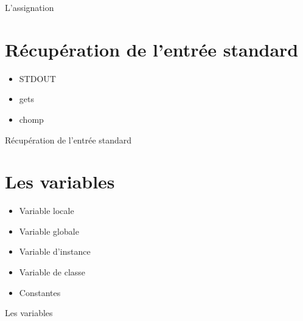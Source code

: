 \documentclass{beamer}
\begin{document}
\begin{frame}
  \begin{beamerboxesrounded}{L'assignation}
    
  \end{beamerboxesrounded}
\end{frame}

\section{Récupération de l'entrée standard}

\begin{frame}
  \begin{itemize}
    \item STDOUT
    \item gets
    \item chomp
  \end{itemize}
\end{frame}

\begin{frame}
  \begin{beamerboxesrounded}{R\'ecup\'eration de l'entr\'ee standard}
    
  \end{beamerboxesrounded}
\end{frame}

\section{Les variables}

\begin{frame}
  \begin{itemize}
    \item Variable locale
    \item Variable globale
    \item Variable d'instance
    \item Variable de classe
    \item Constantes
  \end{itemize}
\end{frame}

\begin{frame}
  \begin{beamerboxesrounded}{Les variables}
    
  \end{beamerboxesrounded}
\end{frame}
\end{document}
